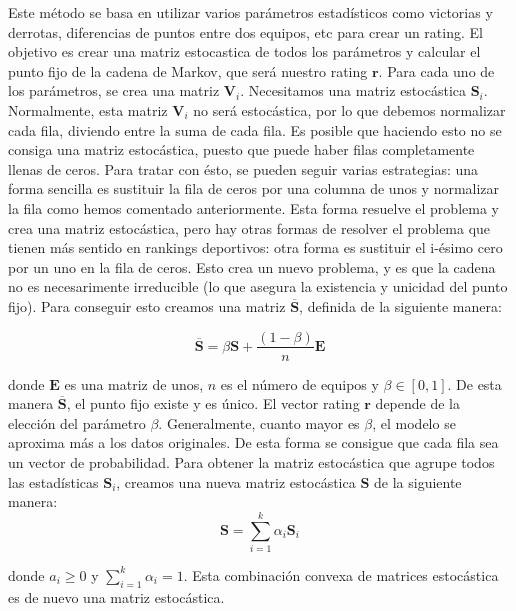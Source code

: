Este método se basa en utilizar varios parámetros estadísticos como victorias y derrotas, diferencias de puntos entre dos equipos, etc para crear un rating. El objetivo es crear una matriz estocastica de todos los parámetros y calcular el punto fijo de la cadena de Markov, que será nuestro rating $\mathbf{r}$. Para cada uno de los parámetros, se crea una matriz $\mathbf{V}_i$. Necesitamos una matriz estocástica $\mathbf{S}_i$. Normalmente, esta matriz $\mathbf{V}_i$ no será estocástica, por lo que debemos normalizar cada fila, diviendo entre la suma de cada fila. Es posible que haciendo esto no se consiga una matriz estocástica, puesto que puede haber filas completamente llenas de ceros. Para tratar con ésto, se pueden seguir varias estrategias: una forma sencilla es sustituir la fila de ceros por una columna de unos y normalizar la fila como hemos comentado anteriormente. Esta forma resuelve el problema y crea una matriz estocástica, pero hay otras formas de resolver el problema que tienen más sentido en rankings deportivos: otra forma es sustituir el i-ésimo cero por un uno en la fila de ceros. Esto crea un nuevo problema, y es que la cadena no es necesarimente irreducible (lo que asegura la existencia y unicidad del punto fijo). Para conseguir esto creamos una matriz $\overline{\mathbf{S}}$, definida de la siguiente manera:

\begin{equation}
\overline{\mathbf{S}} = \beta \mathbf{S} + \dfrac{(1 - \beta)}{n} \mathbf{E}
\end{equation}

donde $\mathbf{E}$ es una matriz de unos, $n$ es el número de equipos y $\beta \in [0, 1]$. De esta manera $\overline{\mathbf{S}}$, el punto fijo existe y es único. El vector rating $\mathbf{r}$ depende de la elección del parámetro $\beta$. Generalmente, cuanto mayor es $\beta$, el modelo se aproxima más a los datos originales.  
De esta forma se consigue que cada fila sea un vector de probabilidad. Para obtener la matriz estocástica que agrupe todos las estadísticas $\mathbf{S}_i$, creamos una nueva matriz estocástica $\mathbf{S}$ de la siguiente manera: 
\begin{equation}
\mathbf{S} = \sum_{i=1}^{k} \alpha_i \mathbf{S}_i
\end{equation}

donde $a_i \geq 0$ y $\sum_{i=1}^{k} \alpha_i = 1$. Esta combinación convexa de matrices estocástica es de nuevo una matriz estocástica.

